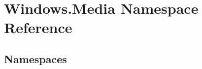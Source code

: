 \hypertarget{namespace_windows_1_1_media}{}\section{Windows.\+Media Namespace Reference}
\label{namespace_windows_1_1_media}
\subsection*{Namespaces}
\begin{DoxyCompactItemize}
\end{DoxyCompactItemize}

